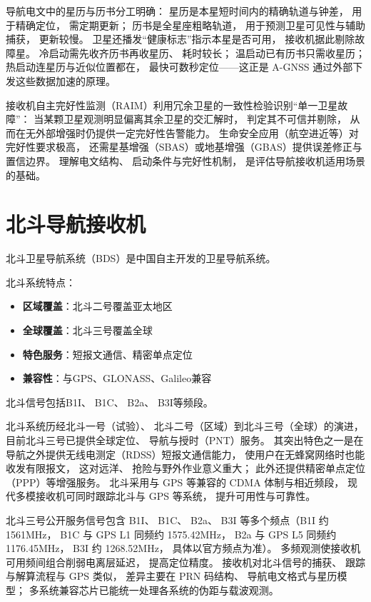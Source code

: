 导航电文中的星历与历书分工明确：
星历是本星短时间内的精确轨道与钟差，
用于精确定位，
需定期更新；
历书是全星座粗略轨道，
用于预测卫星可见性与辅助捕获，
更新较慢。
卫星还播发“健康标志”指示本星是否可用，
接收机据此剔除故障星。
冷启动需先收齐历书再收星历、
耗时较长；
温启动已有历书只需收星历；
热启动连星历与近似位置都在，
最快可数秒定位——这正是 A-GNSS 通过外部下发这些数据加速的原理。

接收机自主完好性监测（RAIM）利用冗余卫星的一致性检验识别“单一卫星故障”：
当某颗卫星观测明显偏离其余卫星的交汇解时，
判定其不可信并剔除，
从而在无外部增强时仍提供一定完好性告警能力。
生命安全应用（航空进近等）对完好性要求极高，
还需星基增强（SBAS）或地基增强（GBAS）提供误差修正与置信边界。
理解电文结构、
启动条件与完好性机制，
是评估导航接收机适用场景的基础。

\section{北斗导航接收机}
\label{sec:beidou_receiver}

北斗卫星导航系统（BDS）是中国自主开发的卫星导航系统。

北斗系统特点：
\begin{itemize}
    \item \textbf{区域覆盖}：北斗二号覆盖亚太地区
    \item \textbf{全球覆盖}：北斗三号覆盖全球
    \item \textbf{特色服务}：短报文通信、精密单点定位
    \item \textbf{兼容性}：与GPS、GLONASS、Galileo兼容
\end{itemize}

北斗信号包括B1I、
B1C、
B2a、
B3I等频段。

北斗系统历经北斗一号（试验）、
北斗二号（区域）到北斗三号（全球）的演进，
目前北斗三号已提供全球定位、
导航与授时（PNT）服务。
其突出特色之一是在导航之外提供无线电测定（RDSS）短报文通信能力，
使用户在无蜂窝网络时也能收发有限报文，
这对远洋、
抢险与野外作业意义重大；
此外还提供精密单点定位（PPP）等增强服务。
北斗采用与 GPS 等兼容的 CDMA 体制与相近频段，
现代多模接收机可同时跟踪北斗与 GPS 等系统，
提升可用性与可靠性。

北斗三号公开服务信号包含 B1I、
B1C、
B2a、
B3I 等多个频点（B1I 约 1561MHz，
B1C 与 GPS L1 同频约 1575.42MHz，
B2a 与 GPS L5 同频约 1176.45MHz，
B3I 约 1268.52MHz，
具体以官方频点为准）。
多频观测使接收机可用频间组合削弱电离层延迟，
提高定位精度。
接收机对北斗信号的捕获、
跟踪与解算流程与 GPS 类似，
差异主要在 PRN 码结构、
导航电文格式与星历模型；
多系统兼容芯片已能统一处理各系统的伪距与载波观测。

